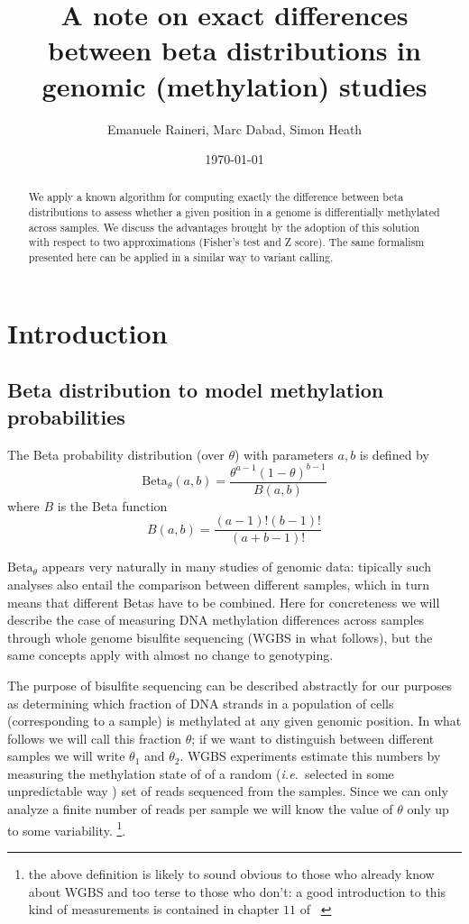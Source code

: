 \documentclass[11pt]{amsart}
\title{A note on exact differences between beta distributions in genomic (methylation) studies}
\author{ Emanuele Raineri, Marc Dabad, Simon Heath }
\date{\today}
\newcommand{\ie}{\textit{i.e.}\ }
\newcommand{\betapdf}{\mbox{Beta}_\theta}
\begin{document}
\begin{abstract}
We apply a known algorithm for computing exactly the difference between beta distributions
to assess whether a given position in a genome is differentially methylated across
samples. We discuss the advantages brought by the adoption of this solution
with respect to two approximations (Fisher's test and Z score).
The same formalism presented here can be applied in a similar way to variant calling.
\end{abstract}
\maketitle
\section{Introduction}
\subsection{Beta distribution to model methylation probabilities}
The Beta probability distribution (over $\theta$) with parameters $a,b$ is defined by 
\[\betapdf(a,b)=\frac{\theta^{a-1}(1-\theta)^{b-1}}{B(a,b)}\]
where  $B$ is the Beta function 
\[B(a,b)=\frac{(a-1)!(b-1)!}{(a+b-1)!}\]

$\betapdf$ appears very naturally in many studies of genomic data: tipically such analyses also entail the comparison between different samples, which in turn means that different Betas have to be combined. Here for concreteness we will describe the case of measuring DNA methylation differences across samples through whole genome bisulfite sequencing (WGBS in what follows), but the same concepts  apply with almost no change to genotyping. 

The purpose of bisulfite sequencing  can be described abstractly for our purposes as determining which fraction of DNA strands in a population of cells (corresponding to a sample) is methylated at any given genomic position. In what follows we will call this fraction $\theta$; if we want to distinguish between different samples we will write $\theta_1$ and $\theta_2$. WGBS experiments estimate this numbers by measuring the methylation state of of a random (\ie selected in some unpredictable way ) set of reads sequenced from the samples. Since we can only analyze a finite number of reads per sample we will know the value of $\theta$ only up to some variability. 
\footnote{the above definition is likely to sound obvious to those who already know about WGBS and too terse to those who don't: a good introduction to this kind of measurements is contained in chapter $11$ of ~\cite{dna}}.
\end{document}
